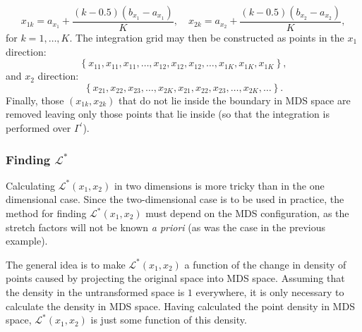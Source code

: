 \begin{equation*}
x_{1k}=a_{x_1}+\frac{(k-0.5)(b_{x_1}-a_{x_1})}{K},\quad
x_{2k}=a_{x_2}+\frac{(k-0.5)(b_{x_2}-a_{x_2})}{K},
\end{equation*}
for $k=1,\dots,K$. The integration grid may then be constructed as points in the $x_1$ direction:
\begin{equation*}
\left \{x_{11},x_{11},x_{11},\dots, x_{12}, x_{12}, x_{12},\dots, x_{1K}, x_{1K}, x_{1K}\right \},
\end{equation*}
and $x_2$ direction:
\begin{equation*}
\left \{x_{21},x_{22}, x_{23},\dots, x_{2K},x_{21},x_{22}, x_{23},\dots, x_{2K},\dots\right \}.
\end{equation*}
Finally, those $(x_{1k},x_{2k})$ that do not lie inside the boundary in MDS space are removed leaving only those points that lie inside (so that the integration is performed over $\Gamma^\prime$).

\subsubsection{Finding $\mathcal{L}^*$}

Calculating $\mathcal{L}^*(x_1,x_2)$ in two dimensions is more tricky than in the one dimensional case. Since the two-dimensional case is to be used in practice, the method for finding $\mathcal{L}^*(x_1,x_2)$ must depend on the MDS configuration, as the stretch factors will not be known \emph{a priori} (as was the case in the previous example).

The general idea is to make $\mathcal{L}^*(x_1,x_2)$ a function of the change in density of points caused by projecting the original space into MDS space. Assuming that the density in the untransformed space is $1$ everywhere, it is only necessary to calculate the density in MDS space. Having calculated the point density in MDS space, $\mathcal{L}^*(x_1,x_2)$ is just some function of this density.

